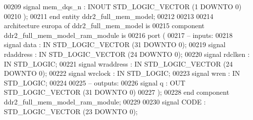 \begin{DoxyCode}
00209                  \textcolor{keywordflow}{signal} \textcolor{vhdlchar}{mem_dqs_n} \textcolor{vhdlchar}{:} \textcolor{keywordflow}{INOUT} \textcolor{comment}{STD\_LOGIC\_VECTOR} \textcolor{vhdlchar}{(}\textcolor{vhdllogic}{}\textcolor{vhdllogic}{1} \textcolor{keywordflow}{DOWNTO} \textcolor{vhdllogic}{}\textcolor{vhdllogic}{0}\textcolor{vhdlchar}{)}
00210               \textcolor{vhdlchar}{)};
00211 \textcolor{keywordflow}{end} \textcolor{keywordflow}{entity} \textcolor{vhdlchar}{ddr2\_full\_mem\_model};
00212 
00213 
00214 \textcolor{keywordflow}{architecture} europa \textcolor{keywordflow}{of} ddr2_full_mem_model is
00215 \textcolor{keywordflow}{component} ddr2_full_mem_model_ram_module \textcolor{keywordflow}{is} 
00216            \textcolor{keywordflow}{port} (
00217 \textcolor{keyword}{                 -- inputs:}
00218                     \textcolor{keywordflow}{signal} data : \textcolor{keywordflow}{IN} \textcolor{comment}{STD\_LOGIC\_VECTOR} (\textcolor{vhdllogic}{}\textcolor{vhdllogic}{31} \textcolor{keywordflow}{DOWNTO} \textcolor{vhdllogic}{}\textcolor{vhdllogic}{0});
00219                     \textcolor{keywordflow}{signal} rdaddress : \textcolor{keywordflow}{IN} \textcolor{comment}{STD\_LOGIC\_VECTOR} (\textcolor{vhdllogic}{}\textcolor{vhdllogic}{24} \textcolor{keywordflow}{DOWNTO} \textcolor{vhdllogic}{}\textcolor{vhdllogic}{0});
00220                     \textcolor{keywordflow}{signal} rdclken : \textcolor{keywordflow}{IN} \textcolor{comment}{STD\_LOGIC};
00221                     \textcolor{keywordflow}{signal} wraddress : \textcolor{keywordflow}{IN} \textcolor{comment}{STD\_LOGIC\_VECTOR} (\textcolor{vhdllogic}{}\textcolor{vhdllogic}{24} \textcolor{keywordflow}{DOWNTO} \textcolor{vhdllogic}{}\textcolor{vhdllogic}{0});
00222                     \textcolor{keywordflow}{signal} wrclock : \textcolor{keywordflow}{IN} \textcolor{comment}{STD\_LOGIC};
00223                     \textcolor{keywordflow}{signal} wren : \textcolor{keywordflow}{IN} \textcolor{comment}{STD\_LOGIC};
00224 
00225 \textcolor{keyword}{                 -- outputs:}
00226                     \textcolor{keywordflow}{signal} q : \textcolor{keywordflow}{OUT} \textcolor{comment}{STD\_LOGIC\_VECTOR} (\textcolor{vhdllogic}{}\textcolor{vhdllogic}{31} \textcolor{keywordflow}{DOWNTO} \textcolor{vhdllogic}{}\textcolor{vhdllogic}{0})
00227                  );
00228 \textcolor{keywordflow}{end} \textcolor{keywordflow}{component} \textcolor{vhdlchar}{ddr2_full_mem_model_ram_module};
00229 
00230                 \textcolor{keywordflow}{signal} \textcolor{vhdlchar}{CODE} \textcolor{vhdlchar}{:}  \textcolor{comment}{STD\_LOGIC\_VECTOR} \textcolor{vhdlchar}{(}\textcolor{vhdllogic}{}\textcolor{vhdllogic}{23} \textcolor{keywordflow}{DOWNTO} \textcolor{vhdllogic}{}\textcolor{vhdllogic}{0}\textcolor{vhdlchar}{)};

\end{DoxyCode}
